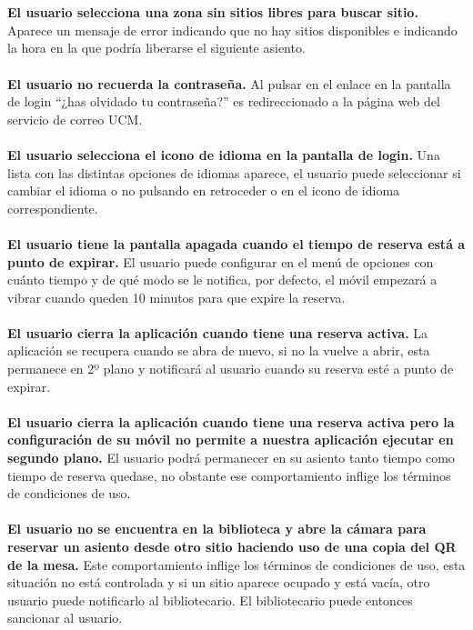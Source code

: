\documentclass[12pt]{article}
\begin{document}
\\
\\
\textbf{El usuario selecciona una zona sin sitios libres para buscar sitio.}
Aparece un mensaje de error indicando que no hay sitios disponibles e indicando la hora en la que podría liberarse el siguiente asiento.
\\
\\
\textbf{El usuario no recuerda la contraseña.}
Al pulsar en el enlace en la pantalla de login “¿has olvidado tu contraseña?” es redireccionado a la página web del servicio de correo UCM.
\\
\\
\textbf{El usuario selecciona el icono de idioma en la pantalla de login.}
Una lista con las distintas opciones de idiomas aparece, el usuario puede seleccionar si cambiar el idioma o no pulsando en retroceder o en el icono de idioma correspondiente.
\\
\\
\textbf{El usuario tiene la pantalla apagada cuando el tiempo de reserva está a punto de expirar.}
El usuario puede configurar en el menú de opciones con cuánto tiempo y de qué modo se le notifica, por defecto, el móvil empezará a vibrar cuando queden 10 minutos para que expire la reserva.
\\
\\
\textbf{El usuario cierra la aplicación cuando tiene una reserva activa.}
La aplicación se recupera cuando se abra de nuevo, si no la vuelve a abrir, esta permanece en 2º plano y notificará al usuario cuando su reserva esté a punto de expirar.
\\
\\
\textbf{El usuario cierra la aplicación cuando tiene una reserva activa pero la configuración de su móvil no permite a nuestra aplicación ejecutar en segundo plano.}
El usuario podrá permanecer en su asiento tanto tiempo como tiempo de reserva quedase, no obstante ese comportamiento inflige los términos de condiciones de uso.
\\
\\
\textbf{El usuario no se encuentra en la biblioteca y abre la cámara para reservar un asiento desde otro sitio haciendo uso de una copia del QR de la mesa.}
Este comportamiento inflige los términos de condiciones de uso, esta situación no está controlada y si un sitio aparece ocupado y está vacía, otro usuario puede notificarlo al bibliotecario. El bibliotecario puede entonces sancionar al usuario.
\\
\\
\end{document}
